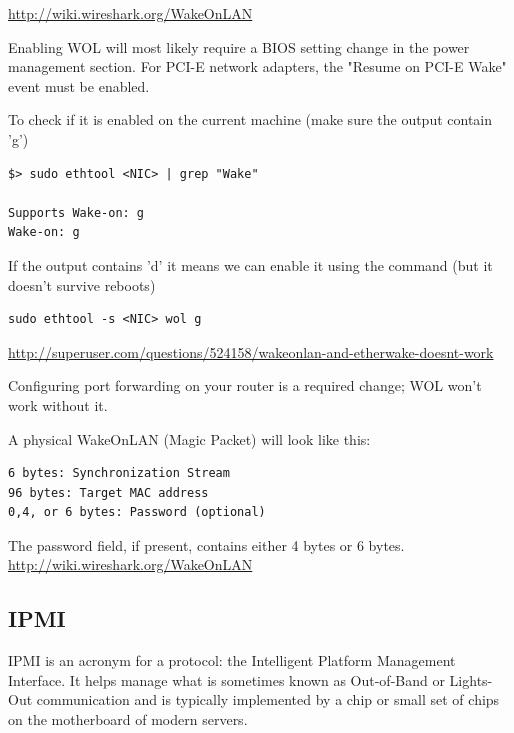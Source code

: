   \url{http://wiki.wireshark.org/WakeOnLAN}
%   
%   
% 


Enabling WOL will most likely require a BIOS setting change in the power
management section. For PCI-E network adapters, the "Resume on PCI-E Wake" event
must be enabled.

To check if it is enabled on the current machine (make sure the output contain
'g')
\begin{verbatim}
$> sudo ethtool <NIC> | grep "Wake"

Supports Wake-on: g
Wake-on: g
\end{verbatim}
If the output contains 'd' it means we can enable it using the command (but it
doesn't survive reboots)
\begin{verbatim}
sudo ethtool -s <NIC> wol g
\end{verbatim}
\url{http://superuser.com/questions/524158/wakeonlan-and-etherwake-doesnt-work}


Configuring port forwarding on your router is a required change; WOL won't work
without it.

A physical WakeOnLAN (Magic Packet) will look like this:
\begin{verbatim}
6 bytes: Synchronization Stream
96 bytes: Target MAC address
0,4, or 6 bytes: Password (optional)
\end{verbatim}
The password field, if present, contains either 4 bytes or 6 bytes.
\url{http://wiki.wireshark.org/WakeOnLAN}


\subsection{IPMI}
\label{sec:IPMI}

IPMI is an acronym for a protocol: the Intelligent Platform Management
Interface. It helps manage what is sometimes known as Out-of-Band or Lights-Out
communication and is typically implemented by a chip or small set of chips on
the motherboard of modern servers.  

